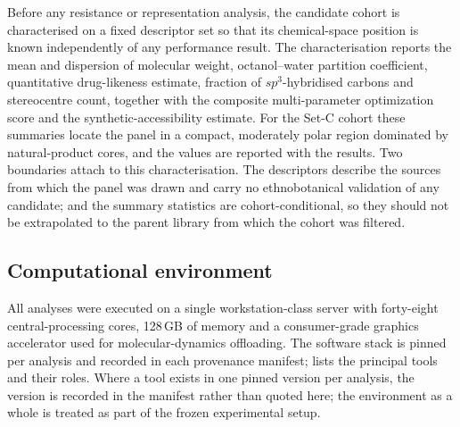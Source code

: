 Before any resistance or representation analysis, the candidate cohort is characterised on a fixed descriptor set so that its chemical-space position is known independently of any performance result. The characterisation reports the mean and dispersion of molecular weight, octanol--water partition coefficient, quantitative drug-likeness estimate, fraction of $sp^3$-hybridised carbons and stereocentre count, together with the composite multi-parameter optimization score and the synthetic-accessibility estimate. For the Set-C cohort these summaries locate the panel in a compact, moderately polar region dominated by natural-product cores, and the values are reported with the results. Two boundaries attach to this characterisation. The descriptors describe the sources from which the panel was drawn and carry no ethnobotanical validation of any candidate; and the summary statistics are cohort-conditional, so they should not be extrapolated to the parent library from which the cohort was filtered.

\subsection{Computational environment}

All analyses were executed on a single workstation-class server with forty-eight central-processing cores, \num{128}\,GB of memory and a consumer-grade graphics accelerator used for molecular-dynamics offloading. The software stack is pinned per analysis and recorded in each provenance manifest;  lists the principal tools and their roles. Where a tool exists in one pinned version per analysis, the version is recorded in the manifest rather than quoted here; the environment as a whole is treated as part of the frozen experimental setup.

